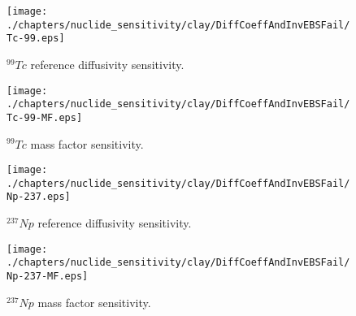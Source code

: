 \begin{figure}[ht!]
\centering
\begin{minipage}[b]{0.45\linewidth}
\texttt{[image: ./chapters/nuclide\_sensitivity/clay/DiffCoeffAndInvEBSFail/Tc-99.eps]}
\caption{$^{99}Tc$ reference diffusivity sensitivity.} 
\label{fig:DCInvTc99}

\end{minipage}
\hspace{0.05\linewidth}
\begin{minipage}[b]{0.45\linewidth}

\texttt{[image: ./chapters/nuclide\_sensitivity/clay/DiffCoeffAndInvEBSFail/Tc-99-MF.eps]}
\caption{$^{99}Tc$ mass factor sensitivity.}
\label{fig:DCInvTc99MF}

\end{minipage}
\end{figure}
\begin{figure}[ht]
\begin{minipage}[b]{0.45\linewidth}

\texttt{[image: ./chapters/nuclide\_sensitivity/clay/DiffCoeffAndInvEBSFail/Np-237.eps]}
\caption{$^{237}Np$ reference diffusivity sensitivity.} 
\label{fig:DCInvNp237}

\end{minipage}
\hspace{0.05\linewidth}
\begin{minipage}[b]{0.45\linewidth}

\texttt{[image: ./chapters/nuclide\_sensitivity/clay/DiffCoeffAndInvEBSFail/Np-237-MF.eps]}
\caption{$^{237}Np$ mass factor sensitivity.}
\label{fig:DCInvNp237MF}

\end{minipage}
\end{figure}


\clearpage


